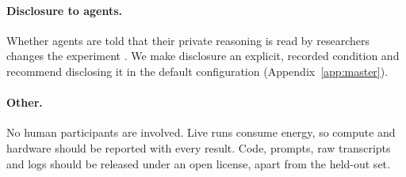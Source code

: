 \paragraph{Disclosure to agents.}
Whether agents are told that their private reasoning is read by researchers changes the experiment \citep{greenblatt2024alignment}.
We make disclosure an explicit, recorded condition and recommend disclosing it in the default configuration (Appendix~\ref{app:master}).

\paragraph{Other.}
No human participants are involved.
Live runs consume energy, so compute and hardware should be reported with every result.
Code, prompts, raw transcripts and logs should be released under an open license, apart from the held-out set.
